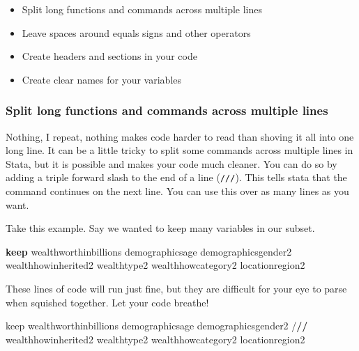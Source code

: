 \documentclass[
]{book}
\newenvironment{Shaded}{\begin{snugshade}}{\end{snugshade}}
\newcommand{\ErrorTok}[1]{\textcolor[rgb]{0.64,0.00,0.00}{\textbf{#1}}}
\newcommand{\KeywordTok}[1]{\textcolor[rgb]{0.13,0.29,0.53}{\textbf{#1}}}
\newcommand{\NormalTok}[1]{#1}
\newcommand{\SpecialCharTok}[1]{\textcolor[rgb]{0.00,0.00,0.00}{#1}}
\providecommand{\tightlist}{%
  \setlength{\itemsep}{0pt}\setlength{\parskip}{0pt}}
\begin{document}
\begin{itemize}
\tightlist
\item
  Split long functions and commands across multiple lines
\item
  Leave spaces around equals signs and other operators
\item
  Create headers and sections in your code
\item
  Create clear names for your variables
\end{itemize}

\hypertarget{split-long-functions-and-commands-across-multiple-lines}{%
\subsubsection*{Split long functions and commands across multiple lines}\label{split-long-functions-and-commands-across-multiple-lines}}

Nothing, I repeat, nothing makes code harder to read than shoving it all into one long line. It can be a little tricky to split some commands across multiple lines in Stata, but it is possible and makes your code much cleaner. You can do so by adding a triple forward slash to the end of a line (\texttt{///}). This tells stata that the command continues on the next line. You can use this over as many lines as you want.

Take this example. Say we wanted to keep many variables in our subset.

\begin{Shaded}
\begin{Highlighting}[]
\KeywordTok{keep}\NormalTok{ wealthworthinbillions demographicsage demographicsgender2 wealthhowinherited2 wealthtype2 wealthhowcategory2 locationregion2}
\end{Highlighting}
\end{Shaded}

These lines of code will run just fine, but they are difficult for your eye to parse when squished together. Let your code breathe!

\begin{Shaded}
\begin{Highlighting}[]
\NormalTok{keep wealthworthinbillions demographicsage demographicsgender2 }\SpecialCharTok{/}\ErrorTok{//}
\NormalTok{  wealthhowinherited2 wealthtype2 wealthhowcategory2 locationregion2}
\end{Highlighting}
\end{Shaded}
\end{document}
